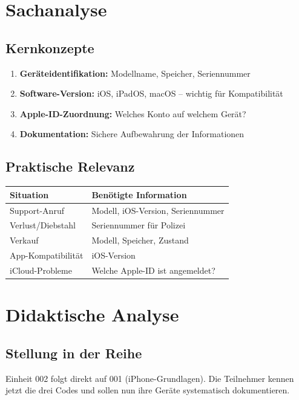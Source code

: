\documentclass[11pt,a4paper]{article}
\begin{document}
\section{Sachanalyse}

\subsection{Kernkonzepte}
\begin{enumerate}
    \item \textbf{Geräteidentifikation:} Modellname, Speicher, Seriennummer
    \item \textbf{Software-Version:} iOS, iPadOS, macOS -- wichtig für Kompatibilität
    \item \textbf{Apple-ID-Zuordnung:} Welches Konto auf welchem Gerät?
    \item \textbf{Dokumentation:} Sichere Aufbewahrung der Informationen
\end{enumerate}

\subsection{Praktische Relevanz}
\begin{tabular}{|l|p{8cm}|}
\hline
\textbf{Situation} & \textbf{Benötigte Information} \\
\hline
Support-Anruf & Modell, iOS-Version, Seriennummer \\
Verlust/Diebstahl & Seriennummer für Polizei \\
Verkauf & Modell, Speicher, Zustand \\
App-Kompatibilität & iOS-Version \\
iCloud-Probleme & Welche Apple-ID ist angemeldet? \\
\hline
\end{tabular}

\section{Didaktische Analyse}

\subsection{Stellung in der Reihe}
Einheit 002 folgt direkt auf 001 (iPhone-Grundlagen). Die Teilnehmer kennen jetzt die drei Codes und sollen nun ihre Geräte systematisch dokumentieren.
\end{document}
